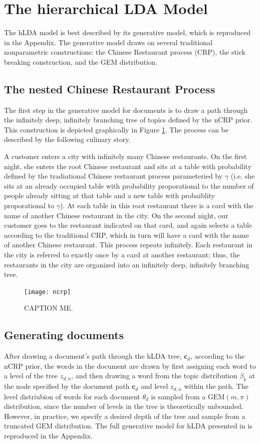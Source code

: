 \documentclass{article}
\begin{document}
\section{The hierarchical LDA Model}
The hLDA model is best described by its generative model, which is reproduced in the Appendix. The generative model draws on several traditional nonparametric constructions: the Chinese Restaurant process (CRP), the stick breaking construction, and the GEM distribution.

\subsection{The nested Chinese Restaurant Process}
The first step in the generative model for documents is to draw a path through the infinitely deep, infinitely branching tree of topics defined by the nCRP prior. This construction is depicted graphically in Figure \ref{fig:ncrp}. The process can be described by the following culinary story. 

A customer enters a city with infinitely many Chinese restaurants. On the first night, she enters the root Chinese restaurant and sits at a table with probability defined by the tradiational Chinese restaurant process parameteried by $\gamma$ (i.e. she sits at an already occupied table with probability proporational to the number of people already sitting at that table and a new table with probaiblity proporational to $\gamma$). At each table in this root restaurant there is a card with the name of another Chinese restaurant in the city. On the second night, our customer goes to the restaurant indicated on that card, and again selects a table according to the traditional CRP, which in turn will have a card with the name of another Chinese restaurant. This process repeats infinitely. Each restaurant in the city is referred to exactly once by a card at another restaurant; thus, the restaurants in the city are organized into an infinitely deep, infinitely branching tree.
 
\begin{figure}[h]
\centering
\texttt{[image: ncrp]}
\caption{CAPTION ME.}
    \label{fig:ncrp}
\end{figure}

\subsection{Generating documents}
After drawing a document's path through the hLDA tree, $\mathbf{c}_d$, according to the nCRP prior, the words in the document are drawn by first assigning each word to a level of the tree $z_{d,n}$, and then drawing a word from the topic distribution $\beta_k$ at the node specified by the document path $\mathbf{c}_d$ and level $z_{d,n}$ within the path. The level distriubion of words for each document $\theta_d$ is sampled from a $\text{GEM}(m, \pi)$ distribution, since the number of levels in the tree is theoretically unbounded. However, in practice, we specify a desired depth of the tree and sample from a truncated $\text{GEM}$ distribution. The full generative model for hLDA presented in \cite{Blei2010} is reproduced in the Appendix.
\end{document}
